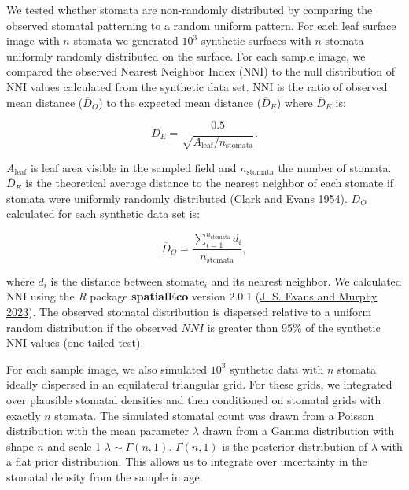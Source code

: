 \documentclass[12pt,halfline,a4paper,]{ouparticle}
\begin{document}
We tested whether stomata are non-randomly distributed by comparing the
observed stomatal patterning to a random uniform pattern. For each leaf
surface image with \(n\) stomata we generated \(10^3\) synthetic
surfaces with \(n\) stomata uniformly randomly distributed on the
surface. For each sample image, we compared the observed Nearest
Neighbor Index (\(\mathrm{NNI}\)) to the null distribution of
\(\mathrm{NNI}\) values calculated from the synthetic data set.
\(\mathrm{NNI}\) is the ratio of observed mean distance
(\(\overline{D}_O\)) to the expected mean distance (\(\overline{D}_E\))
where \(\overline{D}_E\) is:

\begin{equation}\label{eq:emd}
  \overline{D}_E = \frac{0.5}{\sqrt{A_\text{leaf} / n_\text{stomata}}}.
\end{equation}

\noindent \(A_\text{leaf}\) is leaf area visible in the sampled field
and \(n_\text{stomata}\) the number of stomata. \(\overline{D}_E\) is
the theoretical average distance to the nearest neighbor of each stomate
if stomata were uniformly randomly distributed
(\protect\hyperlink{ref-clark_distance_1954}{Clark and Evans 1954}).
\(\overline{D}_O\) calculated for each synthetic data set is:

\begin{equation}\label{eq:omd}
  \overline{D}_O = \frac{\sum_{i=1}^{n_\text{stomata}}d_i}{n_\text{stomata}},
\end{equation}

\noindent where \(d_i\) is the distance between \(\text{stomate}_i\) and
its nearest neighbor. We calculated \(\mathrm{NNI}\) using the \emph{R}
package \textbf{spatialEco} version 2.0.1
(\protect\hyperlink{ref-evans_spatialeco_2023}{J. S. Evans and Murphy
2023}). The observed stomatal distribution is dispersed relative to a
uniform random distribution if the observed \(NNI\) is greater than 95\%
of the synthetic \(\mathrm{NNI}\) values (one-tailed test).

For each sample image, we also simulated \(10^3\) synthetic data with
\(n\) stomata ideally dispersed in an equilateral triangular grid. For
these grids, we integrated over plausible stomatal densities and then
conditioned on stomatal grids with exactly \(n\) stomata. The simulated
stomatal count was drawn from a Poisson distribution with the mean
parameter \(\lambda\) drawn from a Gamma distribution with shape \(n\)
and scale 1 \(\lambda \sim \Gamma(n, 1)\). \(\Gamma(n, 1)\) is the
posterior distribution of \(\lambda\) with a flat prior distribution.
This allows us to integrate over uncertainty in the stomatal density
from the sample image.
\end{document}
